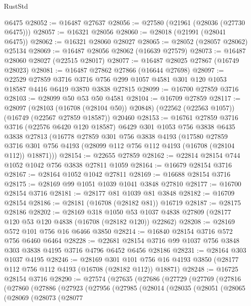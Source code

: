 \begin{lexlean}{RustStd}
\begin{coremodule}
    @6475
@28052 := @16487 @27637
@28056 := @27580 (@21961 (@28036 (@27730 @6475)))
@28057 := @16321 @28056
@28060 := @28018 (@21991 (@28041 @6475))
@28062 := @16321 @28060 @28027
@28065 := @28052 (@28057 @28062) @25134
@28069 := @16487 @28056 @28062 (@16639 @27579)
@28073 := @16487 @28060 @28027 (@22515 @28017)
@28077 := @16487 @28025 @27867 (@16749 @28023)
@28081 := @16487 @27862 @27866 (@16644 @27698)
@28097 := @22529
    @27859
    @3716
    @3716
    @756
    @299
    @1057
    @4581
    @301
    @120
    @1053
    @18587
    @4416
    @6419
    @3870
    @3838
    @27815
@28099 := @16700 @27859 @3716
@28103 := @28099 @50 @53 @50 @4581
@28104 := @16709 @27859
@28117 := @28097
    (@28103 (@16708 (@28104 @50)) @20848)
    (@22562 (@22563 @1057))
    (@16749 (@22567 @27859 @18587))
    @20460
@28153 := @16761
    @27859
    @3716
    @3716
    (@22576 @6420 @120 @18587)
    @6429
    @301
    @1053
    @756
    @3838
    @6435
    @3838
    @27813
    (@16778
      @27859
      @301
      @756
      @3838
      @4193
      (@17580
        @27859
        @3716
        @301
        @756
        @4193
        (@28099 @112 @756 @112 @4193 (@16708 (@28104 @112)) @18871)))
@28154 := @22655 @27859
@28162 := @22814 @28154 @744 @1052 @1042 @756 @3838 @27811 @1059
@28164 := @16679 @28154 @3716
@28167 := @28164 @1052 @1042 @27811
@28169 := @16688 @28154 @3716
@28175 := @28169 @99 @1051 @1039 @1041 @3848 @27810
@28177 := @16700 @28154 @3716
@28181 := @28177 @81 @1039 @81 @3848
@28182 := @16709 @28154
@28186 := @28181 (@16708 (@28182 @81)) @16719
@28187 := @28175 @28186
@28202 := @28169
    @318
    @1050
    @53
    @1037
    @4838
    @27809
    (@28177 @120 @53 @120 @4838 (@16708 (@28182 @120)) @22862)
@28208 := @28169 @572 @101 @756 @16 @6466 @3850
@28214 := @16840 @28154 @3716 @572 @756 @6460 @6464
@28228 := @22681 @28154 @3716 @99 @1037 @756 @3848 @303 @3838 @4195 @3716 @4796 @6452 @6456 @28186
@28231 := @28164 @303 @1037 @4195
@28246 := @28169
    @301
    @101
    @756
    @16
    @4193
    @3850
    (@28177 @112 @756 @112 @4193 (@16708 (@28182 @112)) @18871)
@28248 := @16725 @28154 @3716
@28290 := @27574
    (@27635
      (@27686
        (@27729
          (@27769
            (@27816
              (@27860
                (@27886
                  (@27923
                    (@27956
                      (@27985
                        (@28014
                          (@28035
                            (@28051
                              (@28065
                                (@28069
                                  (@28073
                                    (@28077

\end{coremodule}
\end{lexlean}
